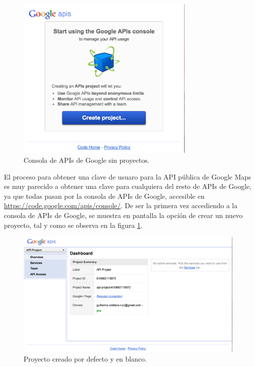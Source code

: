 
\pagestyle{fancy}
\fancyhead[LE,RO]{\thepage}
\fancyhead[LO]{\nouppercase{\rightmark}}
    
 \begin{figure}[H] \centering
    \includegraphics[height=8cm]{graphs/apicreate.png} \caption{Consola de APIs de Google sin proyectos.}\label{fig:apicreate}
\end{figure}
   
    El proceso para obtener una clave de usuaro para la API pública de Google Maps es muy parecido a obtener una clave para cualquiera del resto de APIs de Google, ya que todas pasan por la consola de APIs de Google, accesible en \mbox{\url{https://code.google.com/apis/console/}}. De ser la primera vez accediendo a la consola de APIs de Google, se muestra en pantalla la opción de crear un nuevo proyecto, tal y como se observa en la figura \ref{fig:apicreate}.

 \begin{figure}[H] \centering
    \includegraphics[width=15cm]{graphs/apidashboard.png} \caption{Proyecto  creado por defecto y en blanco.}\label{fig:apidashboard}
\end{figure}

